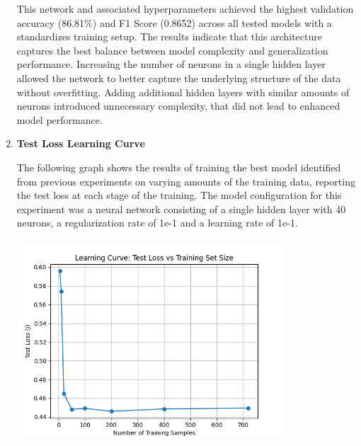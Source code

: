 \documentclass[letterpaper]{article}
\begin{document}
\begin{enumerate}
     This network and associated hyperparameters achieved the highest validation accuracy (86.81\%) and F1 Score (0.8652) across all tested models with a standardizes training setup. The results indicate that this architecture captures the best balance between model complexity and generalization performance. Increasing the number of neurons in a single hidden layer allowed the network to better capture the underlying structure of the data without overfitting. Adding additional hidden layers with similar amounts of neurons introduced unnecessary complexity, that did not lead to enhanced model performance.

     

\item \textbf{Test Loss Learning Curve}

    The following graph shows the results of training the best model identified from previous experiments on varying amounts of the training data, reporting the test loss at each stage of the training. The model configuration for this experiment was a neural network consisting of a single hidden layer with 40 neurons, a regularization rate of 1e-1 and a learning rate of 1e-1.

     \vspace{0.2in}
        \begin{minipage}{\linewidth}
            \centering
            \includegraphics[width=10cm]{figures/raisin_test_loss.png}
        \end{minipage}
        \vspace{0.1in}

        
\end{enumerate}
\end{document}
